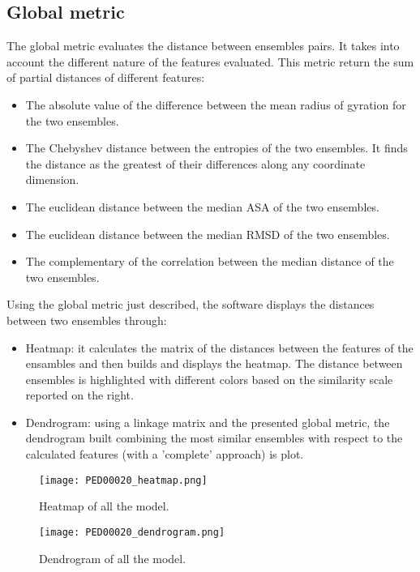 \subsection{Global metric}
The global metric evaluates the distance between ensembles pairs. It takes into account the different nature of the features evaluated.
This metric return the sum of partial distances of different features:
\begin{itemize}
\item The absolute value of the difference between the mean radius of gyration for the two ensembles.
\item The Chebyshev distance between the entropies of the two ensembles. It finds the distance as the greatest of their differences along any coordinate dimension.
\item The euclidean distance between the median ASA of the two ensembles.
\item The euclidean distance between the median RMSD of the two ensembles.
\item The complementary of the correlation between the median distance of the two ensembles.
\end{itemize}


Using the global metric just described, the software displays the distances between two ensembles through:
\begin{itemize}
\item Heatmap: it calculates the matrix of the distances between the features of the ensambles and then builds and displays the heatmap. The distance between ensembles is highlighted with different colors based on the similarity scale reported on the right. 
\item Dendrogram: using a linkage matrix and the presented global metric, the dendrogram built combining the most similar ensembles with respect to the calculated features (with a 'complete' approach) is plot.
\end{itemize}

\begin{figure}[H]
	\begin{minipage}[b]{0.93\textwidth}
		\centering
		\texttt{[image: PED00020\_heatmap.png]}
		\caption{Heatmap of all the model.}
		\label{heatmap}
	\end{minipage}
\end{figure}
\begin{figure}
	\begin{minipage}[b]{0.93\textwidth}
		\centering
		\texttt{[image: PED00020\_dendrogram.png]}
		\caption{Dendrogram of all the model.}
		\label{dendrogram}
	\end{minipage}
\end{figure}

